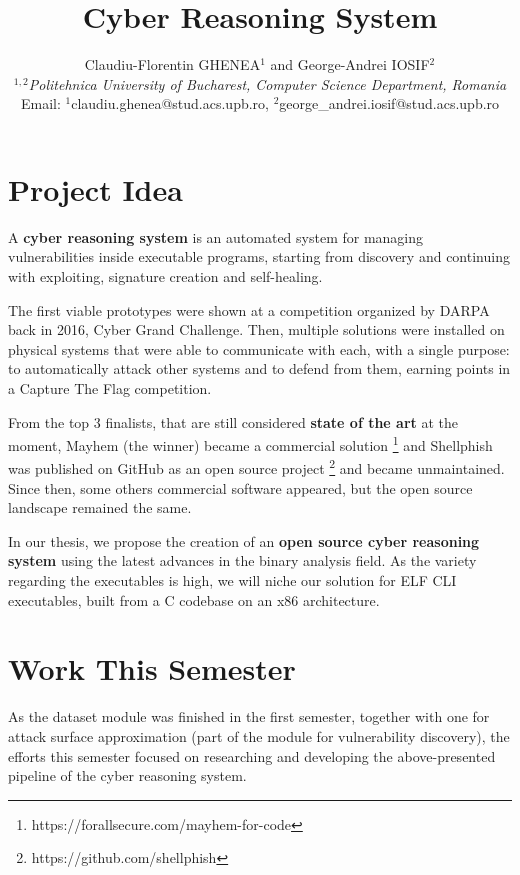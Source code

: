 \documentclass[12pt,a4paper,english,onecolumn]{IEEEtran}
\begin{document}
\title{Cyber Reasoning System}

\author{Claudiu-Florentin GHENEA$^{1}$ and George-Andrei IOSIF$^{2}$\\
$^{1,2}$\emph{Politehnica University of Bucharest, Computer Science Department, Romania}\\
Email: $^{1}$claudiu.ghenea@stud.acs.upb.ro, $^{2}$george\_andrei.iosif@stud.acs.upb.ro}

\maketitle

\section{Project Idea}

A \textbf{cyber reasoning system} is an automated system for managing vulnerabilities inside executable programs, starting from discovery and continuing with exploiting, signature creation and self-healing.

The first viable prototypes were shown at a competition organized by DARPA back in 2016, Cyber Grand Challenge. Then, multiple solutions were installed on physical systems that were able to communicate with each, with a single purpose: to automatically attack other systems and to defend from them, earning points in a Capture The Flag competition.

From the top 3 finalists, that are still considered \textbf{state of the art} at the moment, Mayhem (the winner) became a commercial solution \footnote{https://forallsecure.com/mayhem-for-code} and Shellphish was published on GitHub as an open source project \footnote{https://github.com/shellphish} and became unmaintained. Since then, some others commercial software appeared, but the open source landscape remained the same.

In our thesis, we propose the creation of an \textbf{open source cyber reasoning system} using the latest advances in the binary analysis field. As the variety regarding the executables is high, we will niche our solution for ELF CLI executables, built from a C codebase on an x86 architecture.

\section{Work This Semester}

As the dataset module was finished in the first semester, together with one for attack surface approximation (part of the module for vulnerability discovery), the efforts this semester focused on researching and developing the above-presented pipeline of the cyber reasoning system.
\end{document}
